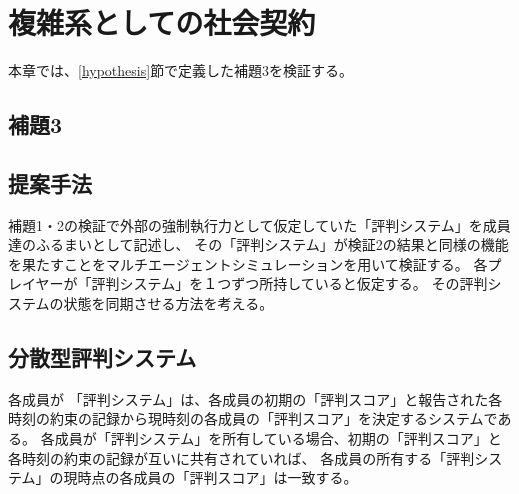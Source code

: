 \chapter{複雑系としての社会契約}
本章では、\ref{hypothesis}節で定義した補題3を検証する。


\section{補題3}
\thirdLemma

\section{提案手法}
補題1・2の検証で外部の強制執行力として仮定していた「評判システム」を成員達のふるまいとして記述し、
その「評判システム」が検証2の結果と同様の機能を果たすことをマルチエージェントシミュレーションを用いて検証する。
各プレイヤーが「評判システム」を１つずつ所持していると仮定する。
その評判システムの状態を同期させる方法を考える。


\section{分散型評判システム}
各成員が
「評判システム」は、各成員の初期の「評判スコア」と報告された各時刻の約束の記録から現時刻の各成員の「評判スコア」を決定するシステムである。
各成員が「評判システム」を所有している場合、初期の「評判スコア」と各時刻の約束の記録が互いに共有されていれば、
各成員の所有する「評判システム」の現時点の各成員の「評判スコア」は一致する。




